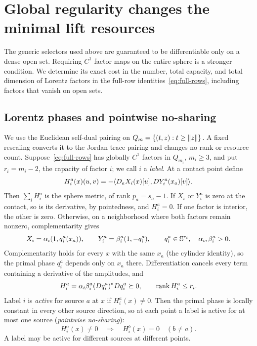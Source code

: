 \section{Global regularity changes the minimal lift resources}\label{sec:regularity}
The generic selectors used above are guaranteed to be differentiable only
on a dense open set.
Requiring $C^1$ factor maps on the entire sphere is a stronger
condition. We determine its exact cost in the number, total capacity,
and total dimension of Lorentz factors in the full-row
identities~\eqref{eq:full-rows}, including factors that vanish on open
sets.

\subsection{Lorentz phases and pointwise no-sharing}
We use the Euclidean self-dual pairing on
$Q_m=\{(t,z):t\geq\lVert z\rVert\}$. A fixed rescaling converts it to the Jordan
trace pairing and changes no rank or resource count.
Suppose~\eqref{eq:full-rows} has globally $C^1$ factors in $Q_{m_i}$,
$m_i\geq3$, and put $r_i=m_i-2$, the capacity of factor $i$; we call
$i$ a \emph{label}. At a contact point define
\[
 H_i^a(x)(u,v)=-\langle D_aX_i(x)[u],DY_i^a(x_a)[v]\rangle.
\]
Then $\sum_iH_i^a$ is the sphere metric, of rank $p_a=s_a-1$.
If $X_i$ or $Y_i^a$ is zero at the contact, so is its derivative, by
pointedness, and $H_i^a=0$. If one factor is interior, the other is zero.
Otherwise, on a neighborhood where both factors remain nonzero,
complementarity gives
\[
 X_i=\alpha_i(1,q_i^a(x_a)),\qquad
 Y_i^a=\beta_i^a(1,-q_i^a),\qquad q_i^a\in\mathbb S^{r_i},
 \quad\alpha_i,\beta_i^a>0.
\]
Complementarity holds for every $x$ with the same $x_a$ (the cylinder
identity), so the primal phase $q_i^a$ depends only on $x_a$ there.
Differentiation cancels every term containing a derivative of the
amplitudes, and
\begin{equation}\label{eq:phase-gram}
 H_i^a=\alpha_i\beta_i^a(Dq_i^a)^*Dq_i^a\succeq0,
 \qquad\operatorname{rank} H_i^a\leq r_i.
\end{equation}
Label $i$ is \emph{active} for source $a$ at $x$ if $H_i^a(x)\ne0$.
Then the primal phase is locally constant in every other source
direction, so at each point a label is active for at most one source
(\emph{pointwise no-sharing}):
\begin{equation}\label{eq:point-no-sharing}
 H_i^a(x)\ne0\quad\Longrightarrow\quad H_i^b(x)=0\quad(b\ne a).
\end{equation}
A label may be active for different sources at different points.

